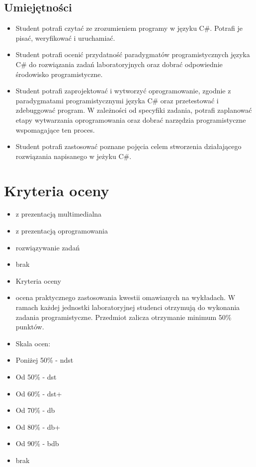 \documentclass[12pt, a4paper]{article}
\begin{document}
\subsection*{Umiejętności}
\begin{itemize}
  \item Student potrafi czytać ze zrozumieniem programy w języku C\#. Potrafi je pisać, weryfikować i uruchamiać.
  \item Student potrafi ocenić przydatność paradygmatów programistycznych języka C\# do rozwiązania zadań laboratoryjnych oraz dobrać odpowiednie środowisko programistyczne.
  \item Student potrafi  zaprojektować i wytworzyć oprogramowanie, zgodnie z  paradygmatami programistycznymi języka C\# oraz przetestować i zdebuggować program. W zależności od specyfiki zadania, potrafi zaplanować etapy wytwarzania oprogramowania oraz dobrać narzędzia programistyczne wspomagające ten proces.
  \item Student potrafi zastosować poznane pojęcia celem stworzenia działającego rozwiązania napisanego w jeżyku C\#.
\end{itemize}

\section{Kryteria oceny}

\begin{itemize}
  \item z prezentacją multimedialna
  \item z prezentacją oprogramowania
  \item rozwiązywanie zadań
  \item brak
  \item Kryteria oceny
  \item ocena praktycznego zastosowania kwestii omawianych na wykładach. W ramach każdej jednostki laboratoryjnej studenci otrzymują do wykonania zadania programistyczne. Przedmiot zalicza otrzymanie minimum 50\% punktów.
  \item Skala ocen:
  \item Poniżej 50\% - ndst
  \item Od 50\% - dst
  \item Od 60\% - dst+
  \item Od 70\% - db
  \item Od 80\% - db+
  \item Od 90\% - bdb
  \item brak
\end{itemize}
\end{document}
